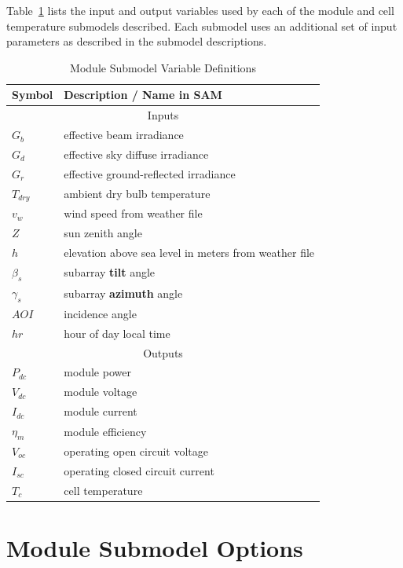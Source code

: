 \documentclass[12pt,letterpaper]{article}
\newcommand\AOI{\ensuremath{\mathit{AOI}}}
\begin{document}
Table~\ref{tab-modulevars} lists the input and output variables used by each of the module and cell temperature submodels described. Each submodel uses an additional set of input parameters as described in the submodel descriptions.

\begin{table}
\begin{center}
\caption{Module Submodel Variable Definitions}
\begin{tabular}{ll}
\midrule
Symbol & Description / \textbf{Name in SAM}\\
\midrule
\multicolumn{2}{c}{Inputs}\\
$G_b$ & effective beam irradiance \\
$G_d$ & effective sky diffuse irradiance \\
$G_r$ & effective ground-reflected irradiance  \\
$T_{dry}$ & ambient dry bulb temperature  \\
$v_w$ & wind speed from weather file \\
$Z$ & sun zenith angle \\
$h$ & elevation above sea level in meters from weather file \\
$\beta_s$ & subarray \textbf{tilt} angle \\
$\gamma_s$ & subarray \textbf{azimuth} angle \\
$\AOI$ & incidence angle \\
$\mathit{hr}$ & hour of day local time \\
\midrule
\multicolumn{2}{c}{Outputs}\\
$P_{dc}$ & module power \\
$V_{dc}$ & module voltage \\
$I_{dc}$ & module current  \\
$\eta_m$ & module efficiency \\
$V_{oc}$ & operating open circuit voltage  \\
$I_{sc}$ & operating closed circuit current \\
$T_c$ & cell temperature \\
\midrule
\end{tabular}
\label{tab-modulevars}
\end{center}
\end{table}

\section{Module Submodel Options}\label{sec-moduleoptions}
\end{document}
